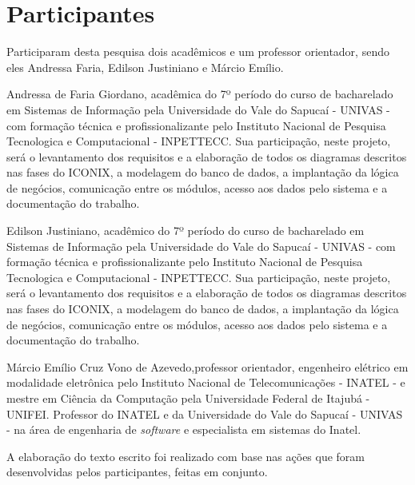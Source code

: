 \section{Participantes}

\par Participaram desta pesquisa dois acadêmicos e um professor orientador, sendo eles Andressa Faria, Edilson Justiniano e Márcio Emílio.
\par Andressa de Faria Giordano, acadêmica do 7º período do curso de bacharelado em Sistemas de Informação pela Universidade do Vale do Sapucaí - UNIVAS - com formação técnica e profissionalizante pelo Instituto Nacional de Pesquisa Tecnologica e Computacional - INPETTECC. Sua participação, neste projeto, será o levantamento dos requisitos e a elaboração de todos os diagramas descritos nas fases do ICONIX, a modelagem do banco de dados, a implantação da lógica de negócios, comunicação entre os módulos, acesso aos dados pelo sistema e a documentação do trabalho.

\par  Edilson Justiniano, acadêmico do 7º período do curso de bacharelado em Sistemas de Informação pela Universidade do Vale do Sapucaí - UNIVAS - com formação técnica e profissionalizante pelo Instituto Nacional de Pesquisa Tecnologica e Computacional - INPETTECC. Sua participação, neste projeto, será o levantamento dos requisitos e a elaboração de todos os diagramas descritos nas fases do ICONIX, a modelagem do banco de dados, a implantação da lógica de negócios, comunicação entre os módulos, acesso aos dados pelo sistema e a documentação do trabalho.

\par Márcio Emílio Cruz Vono de Azevedo,professor orientador, engenheiro elétrico em modalidade eletrônica pelo Instituto Nacional de Telecomunicações - INATEL - e mestre em Ciência da Computação pela Universidade Federal de Itajubá - UNIFEI. Professor do INATEL e da Universidade do Vale do Sapucaí - UNIVAS - na área de engenharia de \textit{software} e especialista em sistemas do Inatel.


\par A elaboração do texto escrito foi realizado com base nas ações que foram desenvolvidas pelos participantes, feitas em conjunto.
